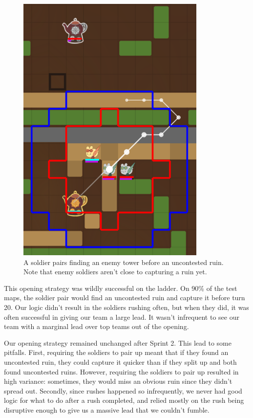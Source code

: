 \begin{figure}[h]
  \centering
  \includegraphics[scale=0.5]{images/rush.png}
  \caption{A soldier pairs finding an enemy tower before an uncontested ruin. Note that enemy soldiers aren't close to capturing a ruin yet.}
\end{figure}

\medskip

This opening strategy was wildly successful on the ladder. On 90\% of the test maps, the soldier pair would find an uncontested ruin and capture it before turn 20. Our logic didn't result in the soldiers rushing often, but when they did, it was often successful in giving our team a large lead. It wasn't infrequent to see our team with a marginal lead over top teams out of the opening.

\medskip

Our opening strategy remained unchanged after Sprint 2. This lead to some pitfalls. First, requiring the soldiers to pair up meant that if they found an uncontested ruin, they could capture it quicker than if they split up and both found uncontested ruins. However, requiring the soldiers to pair up resulted in high variance: sometimes, they would miss an obvious ruin since they didn't spread out. Secondly, since rushes happened so infrequently, we never had good logic for what to do after a rush completed, and relied mostly on the rush being disruptive enough to give us a massive lead that we couldn't fumble.


